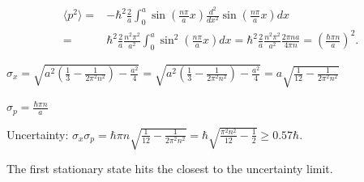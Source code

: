 \begin{align*}
    \langle p^2\rangle
    =& -\hbar^2\frac{2}{a}\int_0^a\sin\left(\frac{n\pi}{a}x\right)\frac{d^2}{dx^2}\sin\left(\frac{n\pi}{a}x\right)dx\\
    =& \hbar^2\frac{2}{a}\frac{n^2\pi^2}{a^2}\int_0^a\sin^2\left(\frac{n\pi}{a}x\right)dx
    =\hbar^2\frac{2}{a}\frac{n^2\pi^2}{a^2}\frac{2\pi n a}{4\pi n} = 
    \left(\frac{\hbar\pi n}{a}\right)^2.
\end{align*}

$\sigma_x=\sqrt{a^2\left(\frac{1}{3}-\frac{1}{2\pi^2n^2}    \right)-\frac{a^2}{4}}=
\sqrt{a^2\left(\frac{1}{3}-\frac{1}{2\pi^2n^2}    \right)-\frac{a^2}{4}}=
a\sqrt{\frac{1}{12}-\frac{1}{2\pi^2n^2}}
$

$\sigma_p = \frac{\hbar\pi n}{a}$

Uncertainty:
$
\sigma_x\sigma_p = 
\hbar\pi n\sqrt{\frac{1}{12}-\frac{1}{2\pi^2n^2}}
=\hbar\sqrt{\frac{\pi^2n^2}{12}-\frac{1}{2}}\geq 0.57\hbar.
$ 

The first stationary state hits the closest to the uncertainty limit.

